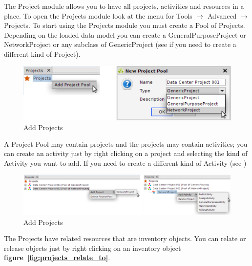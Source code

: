 \documentclass[a4paper]{article}
\begin{document}
			The Project module allows you to have all projects, activities and resources in a place. To open the Projects module look at the menu for Tools $\rightarrow$ Advanced $\rightarrow$ Projects. To start using the Projects module you must create a Pool of Projects. Depending on the loaded data model you can create a  GeneralPurposeProject or NetworkProject or any subclass of GenericProject (see \textbf{} if you need to create a different kind  of Project).
		    
		    \begin{figure}[h!]
		    	\centering
		    	\includegraphics[width=0.5\linewidth]{img/projects_new_project_pool.png}
		    	\caption{Add Projects}	    
		    	\label{fig:projects_actions}
		    \end{figure}
		    		    
		    A Project Pool may contain projects and the projects may contain activities; you can create an activity just by right clicking on a project and selecting the kind of Activity you want to add. If you need to create a different kind of Activity (see \textbf{})
		    
		    \begin{figure}[h!]
		    	\centering
		    	\includegraphics[width=0.9\linewidth]{img/projects_new_project_activity.png}
		    	\caption{Add Projects}	    
		    	\label{fig:projects_new_project_activity}
		    \end{figure}		    
		    
		    The Projects have related resources that are inventory objects. You can relate or release objects just by right clicking on an inventory object \textbf{figure~\ref{fig:projects_relate_to}}.
		    		    		    
\end{document}
